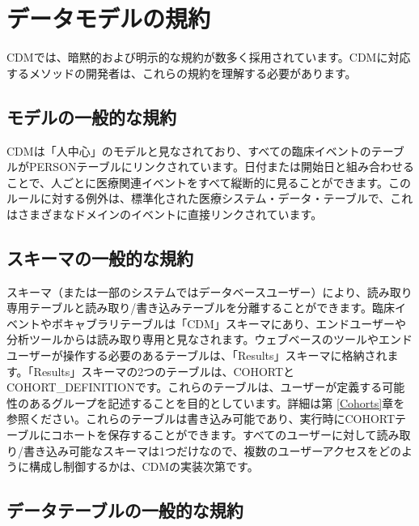 \documentclass[
  11pt]{book}
\theoremstyle{definition}
\theoremstyle{definition}
\theoremstyle{definition}
\theoremstyle{definition}
\theoremstyle{remark}
\begin{document}
\section{データモデルの規約}\label{ux30c7ux30fcux30bfux30e2ux30c7ux30ebux306eux898fux7d04}

CDMでは、暗黙的および明示的な規約が数多く採用されています。CDMに対応するメソッドの開発者は、これらの規約を理解する必要があります。

\subsection{モデルの一般的な規約}\label{model-Conv}

CDMは「人中心」のモデルと見なされており、すべての臨床イベントのテーブルがPERSONテーブルにリンクされています。日付または開始日と組み合わせることで、人ごとに医療関連イベントをすべて縦断的に見ることができます。このルールに対する例外は、標準化された医療システム・データ・テーブルで、これはさまざまなドメインのイベントに直接リンクされています。

\subsection{スキーマの一般的な規約}\label{ux30b9ux30adux30fcux30deux306eux4e00ux822cux7684ux306aux898fux7d04}

スキーマ（または一部のシステムではデータベースユーザー）により、読み取り専用テーブルと読み取り/書き込みテーブルを分離することができます。臨床イベントやボキャブラリテーブルは「CDM」スキーマにあり、エンドユーザーや分析ツールからは読み取り専用と見なされます。ウェブベースのツールやエンドユーザーが操作する必要のあるテーブルは、「Results」スキーマに格納されます。「Results」スキーマの2つのテーブルは、COHORTとCOHORT\_DEFINITIONです。これらのテーブルは、ユーザーが定義する可能性のあるグループを記述することを目的としています。詳細は第 \ref{Cohorts}章を参照ください。これらのテーブルは書き込み可能であり、実行時にCOHORTテーブルにコホートを保存することができます。すべてのユーザーに対して読み取り/書き込み可能なスキーマは1つだけなので、複数のユーザーアクセスをどのように構成し制御するかは、CDMの実装次第です。

\subsection{データテーブルの一般的な規約}\label{ux30c7ux30fcux30bfux30c6ux30fcux30d6ux30ebux306eux4e00ux822cux7684ux306aux898fux7d04}
\end{document}
